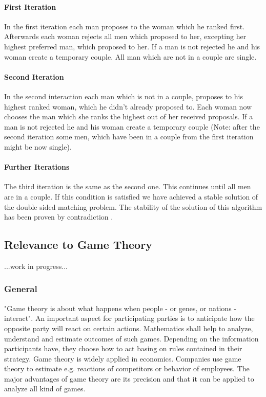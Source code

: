 \paragraph{First Iteration\\}
In the first iteration each man proposes to the woman which he ranked first.
Afterwards each woman rejects all men which proposed to her, excepting her highest preferred man, which proposed to her.
If a man is not rejected he and his woman create a temporary couple.
All man which are not in a couple are single.

\paragraph{Second Iteration\\}
In the second interaction each man which is not in a couple, proposes to his highest ranked woman, which he didn't already proposed to.
Each woman now chooses the man which she ranks the highest out of her received proposals.
If a man is not rejected he and his woman create a temporary couple (Note: after the second iteration some men, which have been in a couple from the first iteration might be now single).

\paragraph{Further Iterations\\}
The third iteration is the same as the second one.
This continues until all men are in a couple.
If this condition is satisfied we have achieved a stable solution of the double sided matching problem.
The stability of the solution of this algorithm has been proven by contradiction \cite[p. 12]{gale62a}.

\subsection{Relevance to Game Theory}
...work in progress...

\subsubsection{General}
"Game theory is about what happens when people - or genes, or nations - interact".
An important aspect for participating parties is to anticipate how the opposite party will react on certain actions.
Mathematics shall help to analyze, understand and estimate outcomes of such games. Depending on the information participants have, they choose how to act basing on rules contained in their strategy.
Game theory is widely applied in economics.
Companies use game theory to estimate e.g. reactions of competitors or behavior of employees.
The major advantages of game theory are its precision and that it can be applied to analyze all kind of games. \cite[p. 1ff]{camerer2003behavioral}

